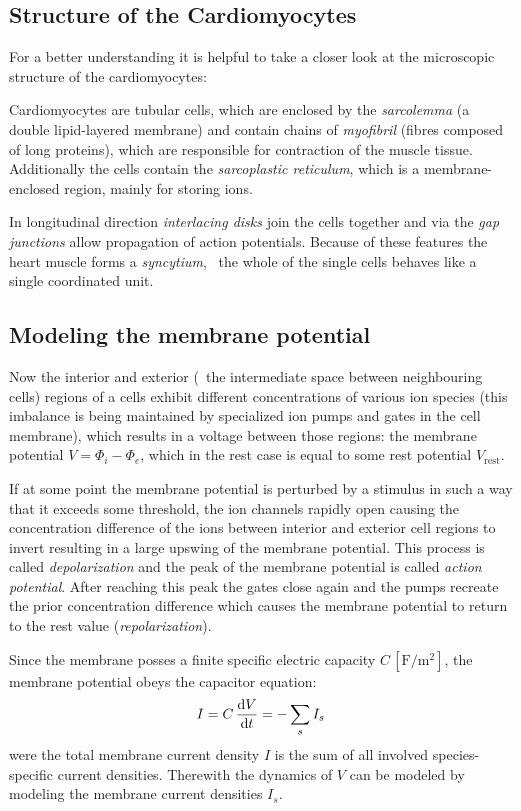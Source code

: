 \subsection{Structure of the Cardiomyocytes}
For a better understanding it is helpful to take a closer look at the
microscopic structure of the cardiomyocytes:

Cardiomyocytes are tubular cells, which are enclosed by the \emph{sarcolemma}
(a double lipid-layered membrane) and contain chains of \emph{myofibril}
(fibres composed of long proteins), which are responsible for contraction of
the muscle tissue.  Additionally the cells contain the \emph{sarcoplastic
reticulum}, which is a membrane-enclosed region, mainly for storing
 ions.

In longitudinal direction \emph{interlacing disks} join the cells together
and via the \emph{gap junctions} allow propagation of action potentials.
Because of these features the heart muscle forms a \emph{syncytium}, \ie~the
whole of the single cells behaves like a single coordinated unit.


\subsection{Modeling the membrane potential}
Now the interior and exterior (\ie~the intermediate space between
neighbouring cells) regions of a cells exhibit different concentrations of
various ion species (this imbalance is being maintained by specialized ion
pumps and gates in the cell membrane), which results in a voltage between
those regions: the membrane potential $V=\Phi_i-\Phi_e$, which in the rest
case is equal to some rest potential $V_{\mathrm{rest}}$.

If at some point the membrane potential is perturbed by a stimulus in such
a way that it exceeds some threshold, the ion channels rapidly open causing
the concentration difference of the ions between interior and exterior
cell regions to invert resulting in a large upswing of the membrane
potential. This process is called \emph{depolarization} and the peak of the
membrane potential is called \emph{action potential}.
After reaching this peak the gates close again and the pumps recreate the
prior concentration difference which causes the membrane potential to
return to the rest value (\emph{repolarization}).

Since the membrane posses a finite specific electric capacity $C\,
[\si{\farad\per\metre\squared}]$,
the membrane potential obeys the capacitor equation:
\begin{equation}
    I=C\,\dv{V}{t}=-\sum_{s}I_{s}
    \label{eq:cap}
\end{equation}
were the total membrane current density $I$ is the sum of all involved
species-specific current densities.
Therewith the dynamics of $V$ can be modeled by modeling the
membrane current densities $I_s$.


